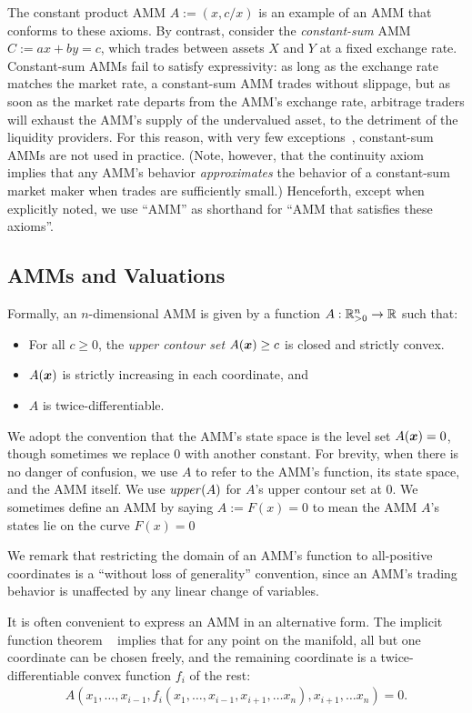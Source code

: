 The constant product AMM $A:=(x,c/x)$ is an example of an AMM
that conforms to these axioms.
By contrast,
consider the \emph{constant-sum} AMM $C:=a x + b y = c$,
which trades between assets $X$ and $Y$ at a fixed exchange rate.
Constant-sum AMMs fail to satisfy expressivity:
as long as the exchange rate matches the market rate,
a constant-sum AMM trades without slippage,
but as soon as the market rate departs from the AMM's exchange rate,
arbitrage traders will exhaust the AMM's supply of the undervalued asset,
to the detriment of the liquidity providers.
For this reason, with very few exceptions~\cite{Mstable},
constant-sum AMMs are not used in practice.
(Note, however, that the continuity axiom implies
that any AMM's behavior \emph{approximates} the behavior of
a constant-sum market maker when trades are sufficiently small.)
Henceforth, except when explicitly noted,
we use ``AMM'' as shorthand for ``AMM that satisfies these axioms''.

\subsection{AMMs and Valuations}
Formally, an $n$-dimensional AMM is given by a function 
$A:\mathbb{R}_{>0}^n \to \mathbb{R}$ such that:
\begin{itemize}
\item
  For all $c \geq 0$,
  the \emph{upper contour set} $A({\boldsymbol x}) \geq c$ is closed and strictly convex.
\item
  $A({\boldsymbol x})$ is strictly increasing in each coordinate, and
\item
  $A$ is twice-differentiable.
\end{itemize}
We adopt the convention that the AMM's state space is the level set $A({\boldsymbol x}) = 0$, though sometimes we replace 0 with another constant.
For brevity, when there is no danger of confusion,
we use $A$ to refer to the AMM's function,
its state space, and the AMM itself.
We use $\mathit{upper}(A)$ for $A$'s upper contour set at $0$.
We sometimes define an AMM by saying $A := F(x) = 0$
to mean the AMM $A$'s states lie on the curve $F(x) = 0$

We remark that restricting the domain of an AMM's function to all-positive coordinates is a ``without loss of generality'' convention,
since an AMM's trading behavior is unaffected
by any linear change of variables.

It is often convenient to express an AMM in an alternative form.
The implicit function theorem ~\cite{implicit} implies that for any point on the manifold,
all but one coordinate can be chosen freely,
and the remaining coordinate is a twice-differentiable 
convex function $f_i$ of the rest:
\begin{multline*}
  A(x_1, \ldots, x_{i-1}, f_i(x_1, \ldots, x_{i-1}, x_{i+1}, \ldots x_n), x_{i+1}, \ldots x_n) = 0.
\end{multline*}

